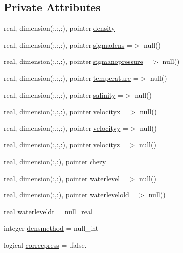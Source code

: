 \subsection*{Private Attributes}
\begin{DoxyCompactItemize}
\item 
real, dimension(\+:,\+:,\+:), pointer \mbox{\hyperlink{structmodulemodel_1_1t__externalvar_ad75981d6e0dbdc3867da00820a1ff2c6}{density}}
\item 
real, dimension(\+:,\+:,\+:), pointer \mbox{\hyperlink{structmodulemodel_1_1t__externalvar_aba62e7936b901d8b6cece171c53a37a3}{sigmadens}} =$>$ null()
\item 
real, dimension(\+:,\+:,\+:), pointer \mbox{\hyperlink{structmodulemodel_1_1t__externalvar_a20fbee980df88f0446901f60f9537976}{sigmanopressure}} =$>$ null()
\item 
real, dimension(\+:,\+:,\+:), pointer \mbox{\hyperlink{structmodulemodel_1_1t__externalvar_aff67fe08320969b8a095a9e9979bfa90}{temperature}} =$>$ null()
\item 
real, dimension(\+:,\+:,\+:), pointer \mbox{\hyperlink{structmodulemodel_1_1t__externalvar_ad3c447e71f56cbc16d1695dcf628324a}{salinity}} =$>$ null()
\item 
real, dimension(\+:,\+:,\+:), pointer \mbox{\hyperlink{structmodulemodel_1_1t__externalvar_a1aa4bf2b66b3092e13b0d278176f6633}{velocityx}} =$>$ null()
\item 
real, dimension(\+:,\+:,\+:), pointer \mbox{\hyperlink{structmodulemodel_1_1t__externalvar_a8b87bacdee23c3bb13edbc567edbe6e3}{velocityy}} =$>$ null()
\item 
real, dimension(\+:,\+:,\+:), pointer \mbox{\hyperlink{structmodulemodel_1_1t__externalvar_a10e92088b7acafbeb4c0ebe4db217aff}{velocityz}} =$>$ null()
\item 
real, dimension(\+:,\+:), pointer \mbox{\hyperlink{structmodulemodel_1_1t__externalvar_ad4963b174033a2bcb9c67582d1550eb5}{chezy}}
\item 
real, dimension(\+:,\+:), pointer \mbox{\hyperlink{structmodulemodel_1_1t__externalvar_a3b1039a681feb42500fbc9d2b2d45f89}{waterlevel}} =$>$ null()
\item 
real, dimension(\+:,\+:), pointer \mbox{\hyperlink{structmodulemodel_1_1t__externalvar_aadc0f886133a0e4de14c35823b529d32}{waterlevelold}} =$>$ null()
\item 
real \mbox{\hyperlink{structmodulemodel_1_1t__externalvar_a9dea39556617aa1465eec174c5add062}{waterleveldt}} = null\+\_\+real
\item 
integer \mbox{\hyperlink{structmodulemodel_1_1t__externalvar_a93d0b753845550658a8890fb8f1d76e4}{densmethod}} = null\+\_\+int
\item 
logical \mbox{\hyperlink{structmodulemodel_1_1t__externalvar_a81c20de7bf61c83c2a10903aeac50df9}{correcpress}} = .false.
\end{DoxyCompactItemize}


